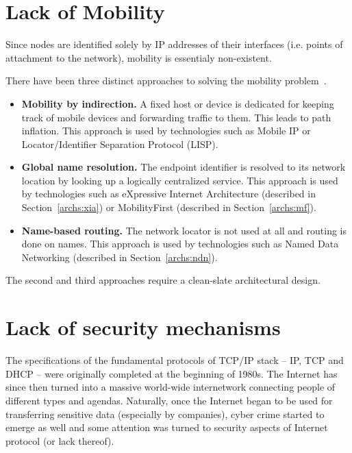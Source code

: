     \section{Lack of Mobility}\label{problems:mobility}

        Since nodes are identified solely by IP addresses of their interfaces (i.e. points of attachment to the network), mobility is essentialy non-existent.

        There have been three distinct approaches to solving the mobility problem~\cite{MobilityFirst}.

        \begin{itemize}
            \item \textbf{Mobility by indirection.} A fixed host or device is dedicated for keeping track of mobile devices and forwarding traffic to them. This leads to path inflation.
            This approach is used by technologies such as Mobile IP or Locator/Identifier Separation Protocol (LISP).
            \item \textbf{Global name resolution.} The endpoint identifier is resolved to its network location by looking up a logically centralized service.
            This approach is used by technologies such as eXpressive Internet Architecture (described in Section~\ref{archs:xia}) or MobilityFirst (described in Section~\ref{archs:mf}).
            \item \textbf{Name-based routing.} The network locator is not used at all and routing is done on names.
            This approach is used by technologies such as Named Data Networking (described in Section~\ref{archs:ndn}).
        \end{itemize}

        The second and third approaches require a clean-slate architectural design.

    \section{Lack of security mechanisms}\label{problems:security}

        The specifications of the fundamental protocols of TCP/IP stack -- IP, TCP and DHCP -- were originally completed at the beginning of 1980s. The Internet has since then turned into a massive world-wide internetwork connecting people of different types and agendas. Naturally, once the Internet began to be used for transferring sensitive data (especially by companies), cyber crime started to emerge as well and some attention was turned to security aspects of Internet protocol (or lack thereof).


